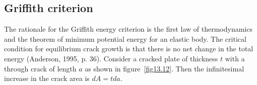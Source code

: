 \documentclass{AeroStructure-ERJohnson}
\begin{document}
\begin{table}[!h]
\vspace*{-1.5pc}
\end{table}

\subsection{Griffith criterion}\label{sec13.5.1}

The rationale for the Griffith energy criterion is the first law of thermodynamics and the theorem of minimum potential energy for an elastic body. The critical condition for equilibrium crack growth is that there is no net change in the total energy (Anderson, 1995, p. 36). Consider a cracked plate of thickness $t$ with a through crack of length $a$ as shown in figure~\ref{fig13.12}. Then the infinitesimal increase in the crack area is $d A=t d a$.

\vspace*{-5pt}

\end{document}
